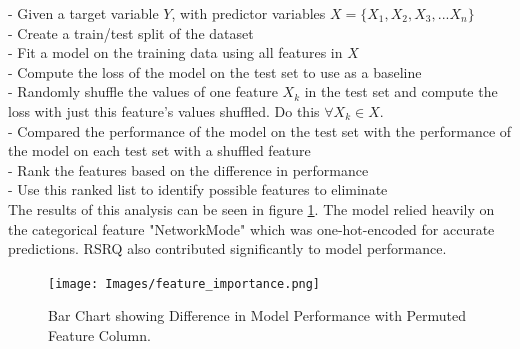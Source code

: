 - Given a target variable $Y$, with predictor variables $X=\{X_1,X_2,X_3,...X_n\}$ \\
- Create a train/test split of the dataset \\
- Fit a model on the training data using all features in $X$ \\
- Compute the loss of the model on the test set to use as a baseline \\
- Randomly shuffle the values of one feature $X_k$ in the test set and compute the loss with just this feature's values shuffled. Do this $\forall X_k \in X$. \\
- Compared the performance of the model on the test set with the performance of the model on each test set with a shuffled feature \\
- Rank the features based on the difference in performance \\
- Use this ranked list to identify possible features to eliminate \\

The results of this analysis can be seen in figure \ref{fig:feature_importance}. The model relied heavily on the categorical feature "NetworkMode" which was one-hot-encoded for accurate predictions. RSRQ also contributed significantly to model performance.
\newpage
\begin{figure}[h]
\texttt{[image: Images/feature\_importance.png]}
\centering
\caption{Bar Chart showing Difference in Model Performance with Permuted Feature Column.}
\label{fig:feature_importance}
\end{figure}

